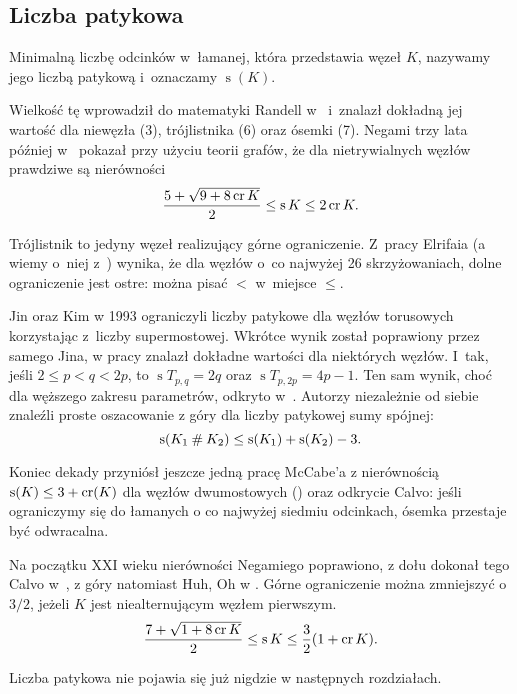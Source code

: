 \subsection{Liczba patykowa}


\begin{definition}
    Minimalną liczbę odcinków w~łamanej, która przedstawia węzeł $K$, nazywamy jego liczbą patykową i~oznaczamy $\operatorname{s}(K)$.
\end{definition}

Wielkość tę wprowadził do matematyki Randell w~\cite{randell98} i~znalazł dokładną jej wartość dla niewęzła (3), trójlistnika (6) oraz ósemki (7).
Negami trzy lata później w~\cite{negami91} pokazał przy użyciu teorii grafów, że dla nietrywialnych węzłów prawdziwe są nierówności
\begin{equation}
    \frac{5+\sqrt{9 + 8 \operatorname{cr} K}}{2} \le \operatorname{s} K \le 2 \operatorname{cr} K.
\end{equation}

Trójlistnik to jedyny węzeł realizujący górne ograniczenie.
Z~pracy Elrifaia \cite{elrifai06} (a wiemy o~niej z~\cite[s. 1]{huh11}) wynika, że dla węzłów o~co najwyżej 26 skrzyżowaniach, dolne ograniczenie jest ostre: można pisać $<$ w~miejsce $\le$.

Jin oraz Kim w 1993 ograniczyli liczby patykowe dla węzłów torusowych korzystając z~liczby supermostowej.
Wkrótce wynik został poprawiony przez samego Jina, w pracy \cite{jin97} znalazł dokładne wartości dla niektórych węzłów.
I~tak, jeśli $2 \le p < q < 2p$, to $\operatorname{s} T_{p,q} = 2q$ oraz $\operatorname{s} T_{p, 2p} = 4p-1$.
Ten sam wynik, choć dla węższego zakresu parametrów, odkryto w~\cite{greilsheimer97}.
%
Autorzy niezależnie od siebie znaleźli proste oszacowanie z góry dla liczby patykowej sumy spójnej:
\begin{equation}
    \operatorname{s}(K_1 \mathbin{\#} K_2) \le \operatorname{s}(K_1) + \operatorname{s}(K_2) - 3.
\end{equation}

Koniec dekady przyniósł jeszcze jedną pracę McCabe'a z nierównością $\operatorname{s}(K) \le 3 + \operatorname{cr} (K)$ dla węzłów dwumostowych (\cite{mccabe98}) oraz odkrycie Calvo: jeśli ograniczymy się do łamanych o co najwyżej siedmiu odcinkach, ósemka przestaje być odwracalna.

Na początku XXI wieku nierówności Negamiego poprawiono, z dołu dokonał tego Calvo w~\cite{calvo01}, z góry natomiast Huh, Oh w \cite{huh11}.
Górne ograniczenie można zmniejszyć o $3/2$, jeżeli $K$ jest niealternującym węzłem pierwszym.
\begin{equation}
    \frac{7+\sqrt{1 + 8 \operatorname{cr} K}}{2} \le \operatorname{s} K \le \frac{3}{2} (1 + \operatorname{cr} K).
\end{equation}

Liczba patykowa nie pojawia się już nigdzie w następnych rozdziałach.



